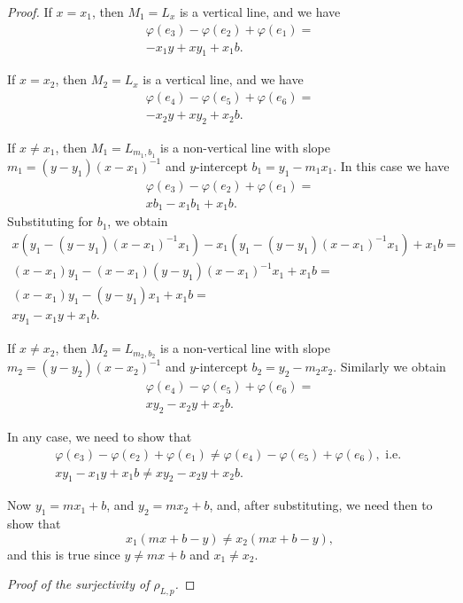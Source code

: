 \documentclass[11pt]{article}
\theoremstyle{definition}
\begin{document}
\begin{proof}
If $x=x_1$, then $M_1 = L_x$ is a vertical line, and we have 
\begin{gather*}
\varphi(e_3) - \varphi(e_2) + \varphi(e_1) = \\
-x_1y + xy_1 + x_1b.
\end{gather*}

If $x=x_2$, then $M_2 = L_x$ is a vertical line, and we have
\begin{gather*}
\varphi(e_4) - \varphi(e_5) + \varphi(e_6) = \\
-x_2y + xy_2 + x_2b.
\end{gather*}

If $x \neq x_1$, then $M_1 = L_{m_1,b_1}$ is a non-vertical line with slope $m_1 = (y-y_1)(x-x_1)^{-1}$ and $y$-intercept $b_1 = y_1 - m_1 x_1.$  In this case we have
\begin{gather*}
\varphi(e_3) - \varphi(e_2) + \varphi(e_1) = \\
xb_1 - x_1b_1 + x_1b.
\end{gather*}
Substituting for $b_1$, we obtain
\begin{gather*}
x(y_1 - (y-y_1)(x-x_1)^{-1}x_1) - x_1(y_1 - (y-y_1)(x-x_1)^{-1}x_1) + x_1b = \\
(x-x_1)y_1 - (x-x_1)(y-y_1)(x-x_1)^{-1}x_1 + x_1b = \\
(x-x_1)y_1 - (y-y_1)x_1 + x_1b = \\
xy_1 - x_1y + x_1b.
\end{gather*}

If $x \neq x_2$, then $M_2 = L_{m_2,b_2}$ is a non-vertical line with slope $m_2 = (y-y_2)(x-x_2)^{-1}$ and $y$-intercept $b_2 = y_2 - m_2 x_2.$
Similarly we obtain 
\begin{gather*}
\varphi(e_4) - \varphi(e_5) + \varphi(e_6) = \\
xy_2 - x_2y + x_2b.
\end{gather*}

In any case, we need to show that 
\begin{gather*}
\varphi(e_3) - \varphi(e_2) + \varphi(e_1) \neq \varphi(e_4) - \varphi(e_5) + \varphi(e_6), \text{  i.e.  } \\
xy_1 - x_1y + x_1b \neq xy_2 - x_2y + x_2b.
\end{gather*}

Now $y_1 = mx_1 + b$, and $y_2 = mx_2 + b$, and, after substituting, we need then to show that
$$x_1(mx + b - y) \neq x_2(mx + b - y),$$
and this is true since $y \neq mx + b$ and $x_1 \neq x_2$.

\textit{Proof of the surjectivity of $\rho_{L,p}$.}


\end{proof}
\end{document}
